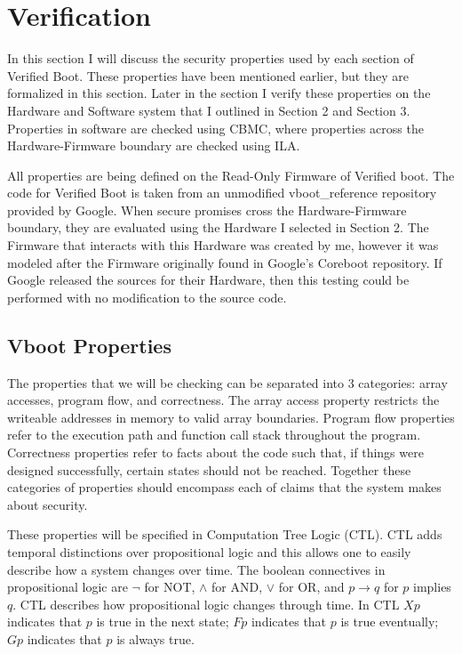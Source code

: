 \documentclass[../report.tex]{subfiles}
\begin{document}
\onehalfspacing

\pagebreak
\section{Verification}\label{sec:Verif}

In this section I will discuss the security properties used by each section of
Verified Boot. These properties have been mentioned earlier, but they are
formalized in this section.
Later in the section I verify these properties on the Hardware and
Software system that I outlined in Section 2 and Section 3.
Properties in software are checked using CBMC, where properties across the Hardware-Firmware boundary are checked using ILA.

All properties are being defined on the Read-Only Firmware of Verified boot.
The code for Verified Boot is taken from an unmodified vboot\_reference repository provided by Google. 
When secure promises cross the Hardware-Firmware boundary, they are evaluated
using the Hardware I selected in Section 2.
The Firmware that interacts with this Hardware was created by me, however it was 
modeled after the Firmware originally found in Google's Coreboot repository. 
If Google released the sources for their Hardware, then this testing could be
performed with no modification to the source code. 

\subsection{Vboot Properties}

The properties that we will be checking can be separated into 3 categories: array accesses, program flow, and correctness.
The array access property restricts the writeable addresses in memory to valid array boundaries. 
Program flow properties refer to the execution path and function call stack throughout the program.
Correctness properties refer to facts about the code such that, if things were
designed successfully, certain states should not be reached.
Together these categories of properties should encompass each of claims that the system makes about security.

These properties will be specified in Computation Tree Logic (CTL). 
CTL adds temporal distinctions over propositional logic and this allows one to easily describe how a system changes over time.
The boolean connectives in propositional logic are $\lnot$ for NOT, $\land$ for
AND, $\lor$ for OR, and $p \to q$ for $p$ implies $q$.
CTL describes how propositional logic changes through time.
In CTL $Xp$ indicates that $p$ is true in the next state; $Fp$ indicates that $p$ is true eventually; $Gp$ indicates that $p$ is always true.
\end{document}
